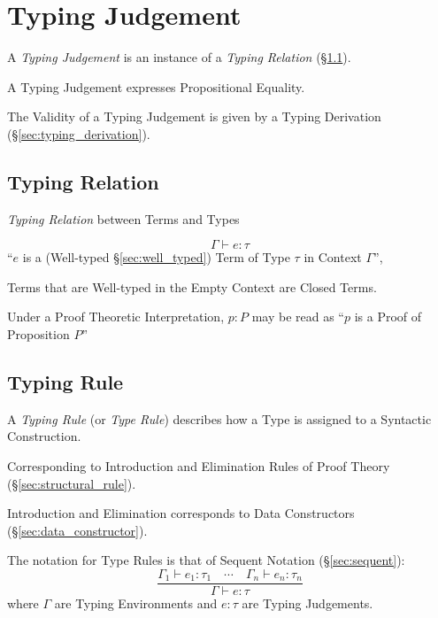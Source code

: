 \section{Typing Judgement}\label{sec:typing_judgement}

A \emph{Typing Judgement} is an instance of a \emph{Typing Relation}
(\S\ref{sec:typing_relation}).

A Typing Judgement expresses Propositional Equality. %

The Validity of a Typing Judgement is given by a Typing Derivation
(\S\ref{sec:typing_derivation}).



\subsection{Typing Relation}\label{sec:typing_relation}

\emph{Typing Relation} between Terms and Types

\[
  \Gamma \vdash e : \tau
\]
``$e$ is a (Well-typed \S\ref{sec:well_typed}) Term of Type $\tau$ in
Context $\Gamma$'',

Terms that are Well-typed in the Empty Context are Closed Terms.

Under a Proof Theoretic Interpretation, $p : P$ may be read as ``$p$
is a Proof of Proposition $P$''



\subsection{Typing Rule}\label{sec:typing_rule}

A \emph{Typing Rule} (or \emph{Type Rule}) describes how a Type is
assigned to a Syntactic Construction.

Corresponding to Introduction and Elimination Rules of Proof Theory
(\S\ref{sec:structural_rule}).

Introduction and Elimination corresponds to Data Constructors
(\S\ref{sec:data_constructor}).

The notation for Type Rules is that of Sequent Notation
(\S\ref{sec:sequent}):
\[
  {
    \frac
    { \Gamma_1 \vdash e_1:\tau_1 \quad \cdots
      \quad \Gamma_n \vdash e_n:\tau_n }
    { \Gamma \vdash e:\tau }
  }
\]
where $\Gamma$ are Typing Environments and $e:\tau$ are Typing
Judgements.



